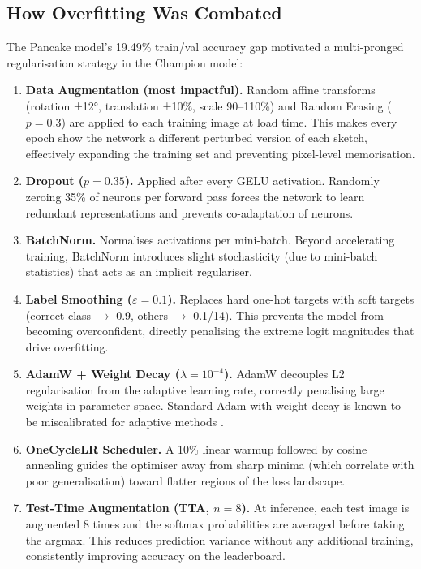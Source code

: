 \documentclass[11pt,a4paper]{article}
\begin{document}
\subsection{How Overfitting Was Combated}

The Pancake model's 19.49\% train/val accuracy gap motivated a multi-pronged regularisation strategy in the Champion model:

\begin{enumerate}[label=\arabic*., leftmargin=*, noitemsep]

    \item \textbf{Data Augmentation (most impactful).} Random affine transforms (rotation ±12°, translation ±10\%, scale 90--110\%) and Random Erasing ($p = 0.3$) are applied to each training image at load time. This makes every epoch show the network a different perturbed version of each sketch, effectively expanding the training set and preventing pixel-level memorisation.

    \item \textbf{Dropout ($p = 0.35$).} Applied after every GELU activation. Randomly zeroing 35\% of neurons per forward pass forces the network to learn redundant representations and prevents co-adaptation of neurons.

    \item \textbf{BatchNorm.} Normalises activations per mini-batch. Beyond accelerating training, BatchNorm introduces slight stochasticity (due to mini-batch statistics) that acts as an implicit regulariser.

    \item \textbf{Label Smoothing ($\varepsilon = 0.1$).} Replaces hard one-hot targets with soft targets (correct class $\to$ 0.9, others $\to$ 0.1/14). This prevents the model from becoming overconfident, directly penalising the extreme logit magnitudes that drive overfitting.

    \item \textbf{AdamW + Weight Decay ($\lambda = 10^{-4}$).} AdamW decouples L2 regularisation from the adaptive learning rate, correctly penalising large weights in parameter space. Standard Adam with weight decay is known to be miscalibrated for adaptive methods \cite{Loshchilov2019}.

    \item \textbf{OneCycleLR Scheduler.} A 10\% linear warmup followed by cosine annealing guides the optimiser away from sharp minima (which correlate with poor generalisation) toward flatter regions of the loss landscape.

    \item \textbf{Test-Time Augmentation (TTA, $n = 8$).} At inference, each test image is augmented 8 times and the softmax probabilities are averaged before taking the argmax. This reduces prediction variance without any additional training, consistently improving accuracy on the leaderboard.

\end{enumerate}
\end{document}
